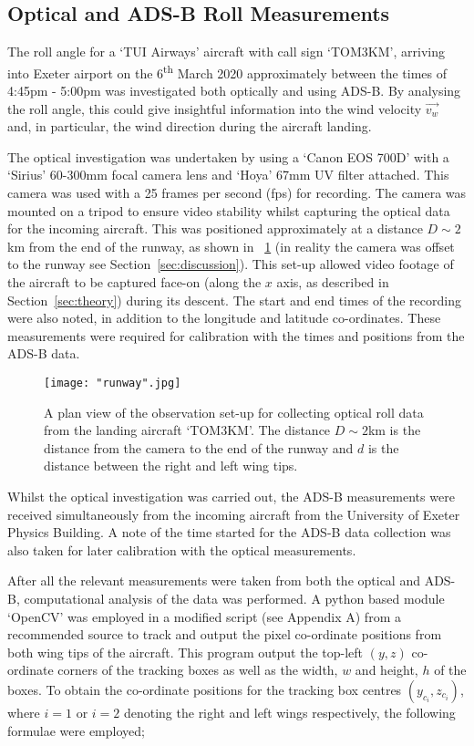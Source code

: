 \documentclass[11pt]{article}
\newcommand{\figref}[2][\figurename~]{#1\ref{#2}}
\newcommand{\secref}[2][Section~]{#1\ref{#2}}
\begin{document}
\subsection{Optical and ADS-B Roll Measurements}
\label{ssec:roll-method}

The roll angle for a `TUI Airways' aircraft with call sign `TOM3KM', arriving into Exeter airport on the 6\textsuperscript{th} March 2020 approximately between the times of 4:45pm - 5:00pm was investigated both optically and using ADS-B. By analysing the roll angle, this could give insightful information into the wind velocity $\Vec{v_w}$ and, in particular, the wind direction during the aircraft landing.

The optical investigation was undertaken by using a `Canon EOS 700D' with a `Sirius' 60-300mm focal camera lens and `Hoya' 67mm UV filter attached. This camera was used with a 25 frames per second (fps) for recording. The camera was mounted on a tripod to ensure video stability whilst capturing the optical data for the incoming aircraft. This was positioned approximately at a distance $D \sim 2$km from the end of the runway, as shown in \figref{fig:runway} (in reality the camera was offset to the runway see \secref{sec:discussion}). This set-up allowed video footage of the aircraft to be captured face-on (along the $x$ axis, as described in \secref{sec:theory}) during its descent. The start and end times of the recording were also noted, in addition to the longitude and latitude co-ordinates. These measurements were required for calibration with the times and positions from the ADS-B data. 


\begin{figure}[h]
\centering
\texttt{[image: "runway".jpg]}
\caption{A plan view of the observation set-up for collecting optical roll data from the landing aircraft `TOM3KM'. The distance $D \sim 2$km is the distance from the camera to the end of the runway and $d$ is the distance between the right and left wing tips.}
\label{fig:runway}
\end{figure}


Whilst the optical investigation was carried out, the ADS-B measurements were received simultaneously from the incoming aircraft from the University of Exeter Physics Building. A note of the time started for the ADS-B data collection was also taken for later calibration with the optical measurements.

After all the relevant measurements were taken from both the optical and ADS-B, computational analysis of the data was performed. A python based module `OpenCV' was employed in a modified script (see Appendix A) from a recommended source \cite{Web06} to track and output the pixel co-ordinate positions from both wing tips of the aircraft. This program output the top-left $(y,z)$ co-ordinate corners of the tracking boxes as well as the width, $w$ and height, $h$ of the boxes. To obtain the co-ordinate positions for the tracking box centres $(y_{c_i},z_{c_i})$, where $i = 1$ or $i = 2$ denoting the right and left wings respectively, the following formulae were employed;
\end{document}
